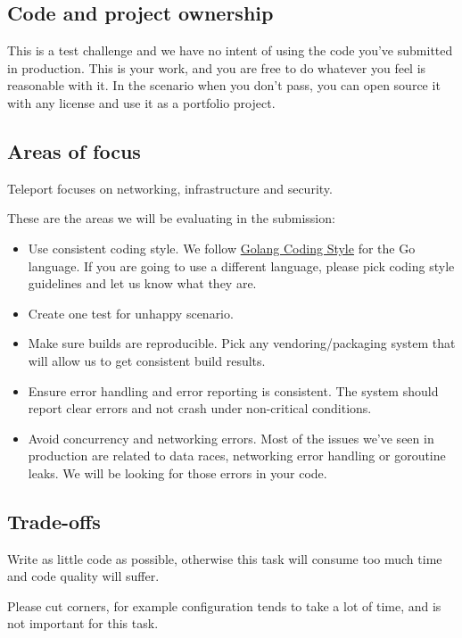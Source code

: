 \documentclass{article}
\begin{document}
\subsection{Code and project ownership}

This is a test challenge and we have no intent of using the code you've submitted in production.
This is your work, and you are free to do whatever you feel is reasonable with it.
In the scenario when you don't pass, you can open source it with any license and use it as a portfolio project.

\subsection{Areas of focus}

Teleport focuses on networking, infrastructure and security.

These are the areas we will be evaluating in the submission:

  \begin{itemize}
  \item Use consistent coding style. We follow \href{https://github.com/golang/go/wiki/CodeReviewComments}{Golang Coding Style} for the Go language. If you are going to use a different language, please pick coding style guidelines and let us know what they are.
  \item Create one test for unhappy scenario.
  \item Make sure builds are reproducible. Pick any vendoring/packaging system that will allow us to get consistent build results.
  \item Ensure error handling and error reporting is consistent. The system should report clear errors and not crash under non-critical conditions.
  \item Avoid concurrency and networking errors. Most of the issues we've seen in production are related to data races, networking error handling or goroutine leaks. We will be looking for those errors in your code.
  \end{itemize}

\subsection{Trade-offs}
       
Write as little code as possible, otherwise this task will consume too much time and code quality will suffer.

Please cut corners, for example configuration tends to take a lot of time, and is not important for this task.
\end{document}
